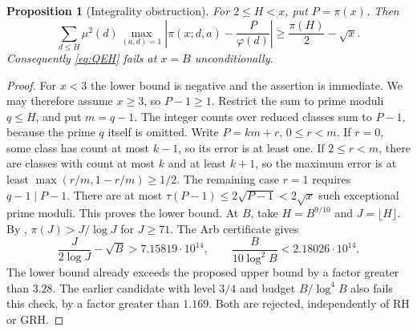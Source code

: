 \documentclass[11pt]{article}
\newtheorem{proposition}[theorem]{Proposition}
\begin{document}
\begin{proposition}[Integrality obstruction]\label{prop:integrality}
For $2\le H<x$, put $P=\pi(x)$. Then
\[
\sum_{d\le H}\mu^2(d)\max_{(a,d)=1}
\left|\pi(x;d,a)-\frac{P}{\varphi(d)}\right|
\ge\frac{\pi(H)}2-\sqrt x.
\]
Consequently \eqref{eq:QEH} fails at $x=B$ unconditionally.
\end{proposition}
\begin{proof}
For $x<3$ the lower bound is negative and the assertion is immediate.
We may therefore assume $x\ge3$, so $P-1\ge1$.
Restrict the sum to prime moduli $q\le H$, and put $m=q-1$.
The integer counts over reduced classes sum to $P-1$, because
the prime $q$ itself is omitted. Write $P=km+r$, $0\le r<m$.
If $r=0$, some class has count at most $k-1$, so its error is at
least one. If $2\le r<m$, there are classes with count at most $k$
and at least $k+1$, so the maximum error is at least
$\max(r/m,1-r/m)\ge1/2$. The remaining case $r=1$ requires
$q-1\mid P-1$. There are at most $\tau(P-1)\le2\sqrt{P-1}<2\sqrt x$
such exceptional prime moduli. This proves the lower bound.
At $B$, take $H=B^{9/10}$ and $J=\lfloor H\rfloor$.
By \cite[Lemma 3.1]{JS}, $\pi(J)>J/\log J$ for $J\ge71$.
The Arb certificate gives
\[
\frac{J}{2\log J}-\sqrt B>7.15819\cdot10^{14},\qquad
\frac{B}{10\log^2B}<2.18026\cdot10^{14}.
\]
The lower bound already exceeds the proposed upper bound by a
factor greater than $3.28$. The earlier candidate with level $3/4$
and budget $B/\log^4B$ also fails this check, by a factor greater than
$1.169$. Both are rejected, independently of RH or GRH.
\end{proof}
\end{document}
